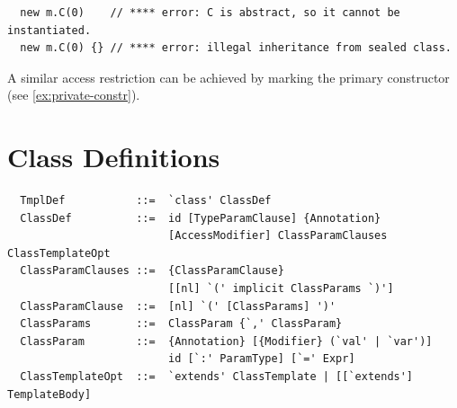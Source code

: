 \begin{lstlisting}
  new m.C(0)    // **** error: C is abstract, so it cannot be instantiated.
  new m.C(0) {} // **** error: illegal inheritance from sealed class.
\end{lstlisting}

A similar access restriction can be achieved by marking the primary
constructor  (see \ref{ex:private-constr}).

\section{Class Definitions}
\label{sec:class-defs}

\syntax\begin{lstlisting} 
  TmplDef           ::=  `class' ClassDef 
  ClassDef          ::=  id [TypeParamClause] {Annotation} 
                         [AccessModifier] ClassParamClauses ClassTemplateOpt 
  ClassParamClauses ::=  {ClassParamClause} 
                         [[nl] `(' implicit ClassParams `)']
  ClassParamClause  ::=  [nl] `(' [ClassParams] ')'
  ClassParams       ::=  ClassParam {`,' ClassParam}
  ClassParam        ::=  {Annotation} [{Modifier} (`val' | `var')] 
                         id [`:' ParamType] [`=' Expr]
  ClassTemplateOpt  ::=  `extends' ClassTemplate | [[`extends'] TemplateBody]
\end{lstlisting}

